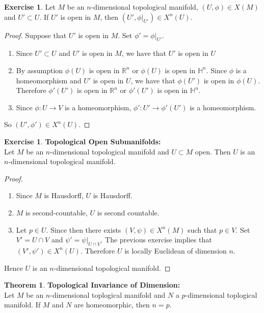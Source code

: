 \documentclass{book}
\theoremstyle{definition}
\newtheorem{thm}[definition]{Theorem}
\newtheorem{ex}[definition]{Exercise}
\renewcommand{\H}{\mathbb{H}}
\newcommand{\R}{\mathbb{R}}
\DeclareMathOperator*{\0}{\mbf{0}}
\DeclareMathOperator*{\1}{\mbf{1}}
\newcommand{\tbf}[1]{\textbf{#1}}
\begin{document}
	\begin{ex}
		Let $M$ be an $n$-dimensional topological manifold, $(U, \phi) \in X(M)$ and $U' \subset U$. If $U'$ is open in $M$, then $(U', \phi|_{U'}) \in X^n(U)$. 
	\end{ex}
	
	\begin{proof}
		Suppose that $U'$ is open in $M$. Set $\phi' = \phi|_{U'}$. 
		\begin{enumerate}
			\item Since $U' \subset U$ and $U'$ is open in $M$, we have that $U'$ is open in $U$
			\item By assumption $\phi(U)$ is open in $\R^n$ or $\phi(U)$ is open in $\H^n$. Since $\phi$ is a homeomorphism and $U'$ is open in $U$, we have that $\phi(U')$ is open in $\phi(U)$. Therefore $\phi'(U')$ is open in $\R^n$ or $\phi'(U')$ is open in $\H^n$.
			\item Since $\phi:U \rightarrow V$ is a homeomorphism, $\phi': U' \rightarrow \phi'(U')$ is a homeomorphism. 
		\end{enumerate}
		So $(U', \phi') \in X^n(U)$. 
	\end{proof}

	\begin{ex} \tbf{Topological Open Submanifolds:}\\
		Let $M$ be an $n$-dimensional topological manifold and $U \subset M$ open. Then $U$ is an $n$-dimensional topological manifold. 
	\end{ex}
	
	\begin{proof} \
		\begin{enumerate}
			\item Since $M$ is Hausdorff, $U$ is Hausdorff.
			\item $M$ is second-countable, $U$ is second countable. 
			\item Let $p \in U$. Since then there exists $(V, \psi) \in X^n(M)$ such that $p \in V$. Set $V' = U \cap V$ and $\psi' = \psi|_{U \cap V}$. The previous exercise implies that $(V', \psi') \in X^n(U)$. Therefore $U$ is locally Euclidean of dimension $n$.
		\end{enumerate}
		Hence $U$ is an $n$-dimensional topological manifold.
	\end{proof}

	\begin{thm} \tbf{Topological Invariance of Dimension:} \\
		Let $M$ be an $n$-dimensional toplogical manifold and $N$ a $p$-dimensional toplogical manifold. If $M$ and $N$ are homeomorphic, then $n = p$.
	\end{thm}
\end{document}
